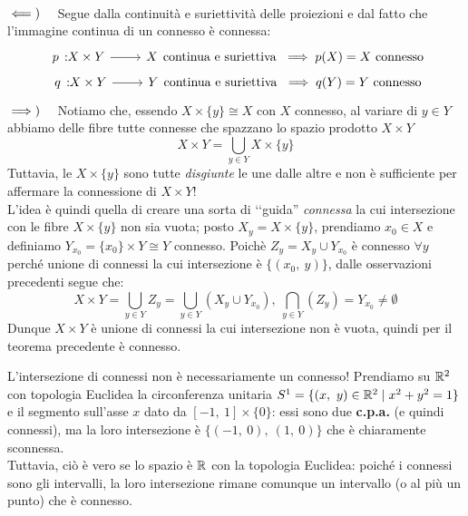 \begin{demonstration}~{}\\
	$\impliedby)\quad$ Segue dalla continuità e suriettività delle proiezioni e dal fatto che l'immagine continua di un connesso è connessa:
		\begin{gather*}
			\funz p {X\times Y} X \text{continua e suriettiva } \implies p(X)=X \text{ connesso}\\
			\funz q {X\times Y} Y \text{continua e suriettiva } \implies q(Y)=Y \text{ connesso}	
		\end{gather*}	
	$\implies)\quad$ Notiamo che, essendo $X\times\{y\}\cong X$ con $X$ connesso, al variare di $y\in Y$ abbiamo delle fibre tutte connesse che spazzano lo spazio prodotto $X\times Y$
	\begin{equation*}
		X\times Y=\bigcup_{y\in Y}X\times\{y\}
	\end{equation*}
	Tuttavia, le $X\times\{y\}$ sono tutte \textit{disgiunte} le une dalle altre e non è sufficiente per affermare la connessione di $X\times Y$!\\
	L'idea è quindi quella di creare una sorta di ‘‘guida'' \textit{connessa} la cui intersezione con le fibre $X\times\{y\}$ non sia vuota; posto $X_y=X\times\{y\}$, prendiamo $x_0\in X$ e definiamo $Y_{x_0}=\{x_0\}\times Y\cong Y$ connesso. Poichè $Z_y=X_y\cup Y_{x_0}$ è connesso $\forall y$ perché unione di connessi la cui intersezione è $\{\left(x_0,\ y\right)\}$, dalle osservazioni precedenti segue che:
		\begin{equation*}
			X\times Y=\bigcup_{y\in Y}Z_y=\bigcup_{y\in Y}\left(X_y \cup Y_{x_0}\right),\ \bigcap_{y\in Y}\left(Z_y\right)=Y_{x_0}\neq\emptyset	
		\end{equation*}
	Dunque $X\times Y$ è unione di connessi la cui intersezione non è vuota, quindi per il teorema precedente è connesso.
\end{demonstration}
\begin{attention}
	L'intersezione di connessi non è necessariamente un connesso! Prendiamo su $\mathbb{R}^2$ con topologia Euclidea la circonferenza unitaria $S^1=\{\left(x,\ y\right)\in \mathbb{R}^2\mid x^2+y^2=1\}$ e il segmento sull'asse $x$ dato da $[-1,\ 1]\times\{0\}$: essi sono due \textbf{c.p.a.} (e quindi connessi), ma la loro intersezione è $\{\left(-1,\ 0\right),\ \left(1,\ 0\right)\}$ che è chiaramente sconnessa.\\
	Tuttavia, ciò è vero se lo spazio è $\mathbb{R}$ con la topologia Euclidea: poiché i connessi sono gli intervalli, la loro intersezione rimane comunque un intervallo (o al più un punto) che è connesso.
\end{attention}
